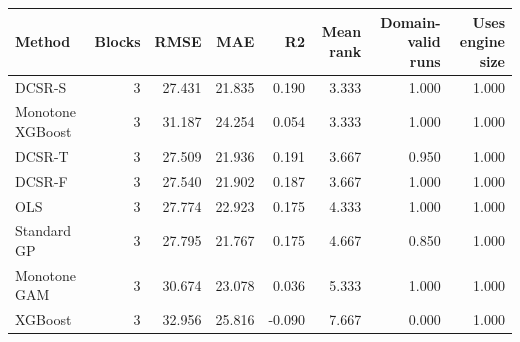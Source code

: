 \begin{tabular}{lrrrrrrr}
\toprule
Method & Blocks & RMSE & MAE & R2 & Mean rank & Domain-valid runs & Uses engine size \\
\midrule
DCSR-S & 3 & 27.431 & 21.835 & 0.190 & 3.333 & 1.000 & 1.000 \\
Monotone XGBoost & 3 & 31.187 & 24.254 & 0.054 & 3.333 & 1.000 & 1.000 \\
DCSR-T & 3 & 27.509 & 21.936 & 0.191 & 3.667 & 0.950 & 1.000 \\
DCSR-F & 3 & 27.540 & 21.902 & 0.187 & 3.667 & 1.000 & 1.000 \\
OLS & 3 & 27.774 & 22.923 & 0.175 & 4.333 & 1.000 & 1.000 \\
Standard GP & 3 & 27.795 & 21.767 & 0.175 & 4.667 & 0.850 & 1.000 \\
Monotone GAM & 3 & 30.674 & 23.078 & 0.036 & 5.333 & 1.000 & 1.000 \\
XGBoost & 3 & 32.956 & 25.816 & -0.090 & 7.667 & 0.000 & 1.000 \\
\bottomrule
\end{tabular}
